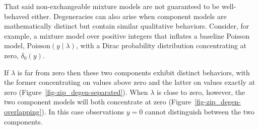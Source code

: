 \documentclass[
  letterpaper,
  DIV=11,
  numbers=noendperiod]{scrartcl}
\begin{document}
That said non-exchangeable mixture models are not guaranteed to be
well-behaved either. Degeneracies can also arise when component models
are mathematically distinct but contain similar qualitative behaviors.
Consider, for example, a mixture model over positive integers that
inflates a baseline Poisson model, \(\mathrm{Poisson}(y \mid \lambda)\),
with a Dirac probability distribution concentrating at zero,
\(\delta_{0}(y)\).

If \(\lambda\) is far from zero then these two components exhibit
distinct behaviors, with the former concentrating on values above zero
and the latter on values exactly at zero
(Figure~\ref{fig-zip_degen-separated}). When \(\lambda\) is close to
zero, however, the two component models will both concentrate at zero
(Figure~\ref{fig-zip_degen-overlapping}). In this case observations
\(y = 0\) cannot distinguish between the two components.
\end{document}
